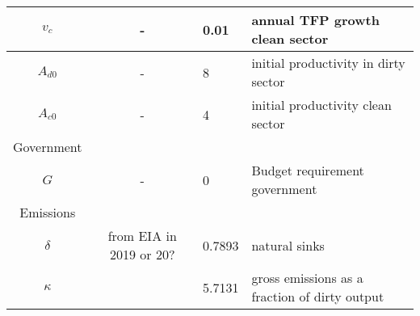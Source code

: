 \begin{table}[hh!!!!!]
\begin{center}
\begin{tabular}{c|cll}
				$v_c$&- &0.01& annual TFP growth clean sector\\
					\hline
				$A_{d0}$&- &8& initial productivity in dirty sector\\
				\hline
					$A_{c0}$&- &4& initial productivity clean sector\\
					\hline
				\hline
				Government&\multicolumn{3}{c}{}\\
				\hline
				\hline
				$G$&- &0& Budget requirement government\\
				\hline
				
				\hline
				Emissions&\multicolumn{3}{c}{}\\
				\hline
				
				\hline
				$\delta$&from EIA in 2019 or 20?&0.7893&natural sinks \\
				\hline
				$\kappa$& &5.7131& \makecell[l]{ gross emissions as a\\ fraction of dirty output}\\
				\hline \hline
			\end{tabular}
		\end{center}
	\end{table}